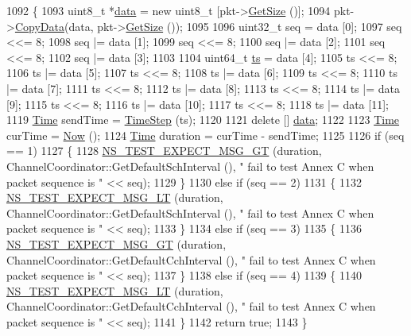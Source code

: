 \begin{DoxyCode}
1092 \{
1093   uint8\_t *\hyperlink{topology-example-sim_8cc_a26c65296e316af77b787dc77469bb2a4}{data} = \textcolor{keyword}{new} uint8\_t [pkt->\hyperlink{classns3_1_1Packet_a462855c9929954d4301a4edfe55f4f1c}{GetSize} ()];
1094   pkt->\hyperlink{classns3_1_1Packet_a5a6d304b9e0d90733919ffe224b98f0d}{CopyData}(data, pkt->\hyperlink{classns3_1_1Packet_a462855c9929954d4301a4edfe55f4f1c}{GetSize} ());
1095 
1096   uint32\_t seq = data [0];
1097   seq <<= 8;
1098   seq |= data [1];
1099   seq <<= 8;
1100   seq |= data [2];
1101   seq <<= 8;
1102   seq |= data [3];
1103 
1104   uint64\_t \hyperlink{lte_2model_2fading-traces_2fading__trace__generator_8m_ada841f58d7be618bfbc76c87e7d44086}{ts} = data [4];
1105   ts <<= 8;
1106   ts |= data [5];
1107   ts <<= 8;
1108   ts |= data [6];
1109   ts <<= 8;
1110   ts |= data [7];
1111   ts <<= 8;
1112   ts |= data [8];
1113   ts <<= 8;
1114   ts |= data [9];
1115   ts <<= 8;
1116   ts |= data [10];
1117   ts <<= 8;
1118   ts |= data [11];
1119   \hyperlink{classns3_1_1Time}{Time} sendTime = \hyperlink{group__time_ga464a3c1cbb458c6c3ed3bd5ce9506758}{TimeStep} (ts);
1120 
1121   \textcolor{keyword}{delete} [] \hyperlink{topology-example-sim_8cc_a26c65296e316af77b787dc77469bb2a4}{data};
1122 
1123   \hyperlink{classns3_1_1Time}{Time} curTime = \hyperlink{group__simulator_gac3635e2e87f7ce316c89290ee1b01d0d}{Now} ();
1124   \hyperlink{classns3_1_1Time}{Time} duration = curTime - sendTime;
1125 
1126   \textcolor{keywordflow}{if} (seq == 1)
1127     \{
1128       \hyperlink{group__testing_ga6ba43672d44c1e85acfb1daf2af66612}{NS\_TEST\_EXPECT\_MSG\_GT} (duration, ChannelCoordinator::GetDefaultSchInterval (), \textcolor{stringliteral}{"
      fail to test Annex C when packet sequence is "} << seq);
1129     \}
1130   \textcolor{keywordflow}{else} \textcolor{keywordflow}{if} (seq == 2)
1131     \{
1132       \hyperlink{group__testing_ga5e7f81b9d00df9c727e6281e1b1bbc55}{NS\_TEST\_EXPECT\_MSG\_LT} (duration, ChannelCoordinator::GetDefaultSchInterval (), \textcolor{stringliteral}{"
      fail to test Annex C when packet sequence is "} << seq);
1133     \}
1134   \textcolor{keywordflow}{else} \textcolor{keywordflow}{if} (seq == 3)
1135     \{
1136       \hyperlink{group__testing_ga6ba43672d44c1e85acfb1daf2af66612}{NS\_TEST\_EXPECT\_MSG\_GT} (duration, ChannelCoordinator::GetDefaultCchInterval (), \textcolor{stringliteral}{"
      fail to test Annex C when packet sequence is "} << seq);
1137     \}
1138   \textcolor{keywordflow}{else} \textcolor{keywordflow}{if} (seq == 4)
1139     \{
1140       \hyperlink{group__testing_ga5e7f81b9d00df9c727e6281e1b1bbc55}{NS\_TEST\_EXPECT\_MSG\_LT} (duration, ChannelCoordinator::GetDefaultCchInterval (), \textcolor{stringliteral}{"
      fail to test Annex C when packet sequence is "} << seq);
1141     \}
1142   \textcolor{keywordflow}{return} \textcolor{keyword}{true};
1143 \}
\end{DoxyCode}


